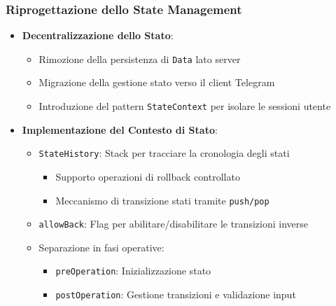 \subsubsection{Riprogettazione dello State Management}
\begin{itemize}
    \item \textbf{Decentralizzazione dello Stato}:
    \begin{itemize}
        \item Rimozione della persistenza di \texttt{Data} lato server
        \item Migrazione della gestione stato verso il client Telegram
        \item Introduzione del pattern \texttt{StateContext} per isolare le sessioni utente
    \end{itemize}

    \item \textbf{Implementazione del Contesto di Stato}:
    \begin{itemize}
        \item \texttt{StateHistory}: Stack per tracciare la cronologia degli stati
        \begin{itemize}
            \item Supporto operazioni di rollback controllato
            \item Meccanismo di transizione stati tramite \texttt{push/pop}
        \end{itemize}
        
        \item \texttt{allowBack}: Flag per abilitare/disabilitare le transizioni inverse
        \item Separazione in fasi operative:
        \begin{itemize}
            \item \texttt{preOperation}: Inizializzazione stato
            \item \texttt{postOperation}: Gestione transizioni e validazione input
        \end{itemize}
    \end{itemize}
\end{itemize}

